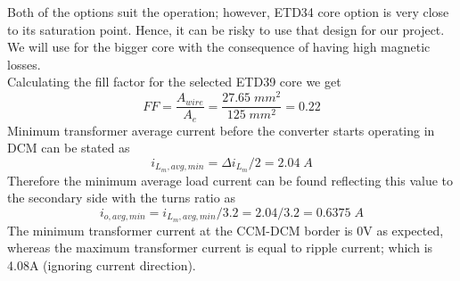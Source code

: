 Both of the options suit the operation; however, ETD34 core option is very close to its saturation point. Hence, it can be risky to use that design for our project. We will use for the bigger core with the consequence of having high magnetic losses. \smallskip \\
Calculating the fill factor for the selected ETD39 core we get 
\begin{equation*}
    FF = \frac{A_{wire}}{A_e} = \frac{27.65 \; mm^2}{125 \; mm^2} = 0.22
\end{equation*}
Minimum transformer average current before the converter starts operating in DCM can be stated as
\begin{equation*}
    i_{L_m,avg,min} = \Delta i_{L_m}/2 = 2.04 \; A 
\end{equation*}
Therefore the minimum average load current can be found reflecting this value to the secondary side with the turns ratio as
\begin{equation*}
    i_{o,avg,min} = i_{L_m,avg,min}/3.2 = 2.04/3.2 = 0.6375 \; A 
\end{equation*}
The minimum transformer current at the CCM-DCM border is 0V as expected, whereas the maximum transformer current is equal to ripple current; which is 4.08A (ignoring current direction).